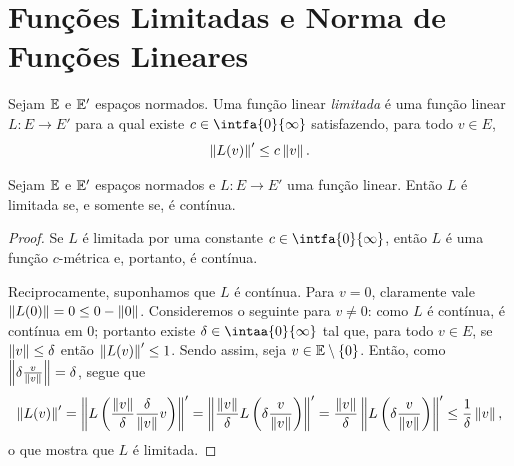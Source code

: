 \section{Funções Limitadas e Norma de Funções Lineares}

\begin{defi}
Sejam $\mathbb{E}$ e $\mathbb{E}'$ espaços normados. Uma função linear \emph{limitada} é uma função linear $L\colon E \to E'$ para a qual existe $c \in \intfa{0}{\infty}$ satisfazendo, para todo $v \in E$,
	\begin{equation*}
	\left\Vert{L(v)}\right\Vert' \leq c \left\Vert{v}\right\Vert.
	\end{equation*}
\end{defi}


\begin{prop}
Sejam $\mathbb{E}$ e $\mathbb{E}'$ espaços normados e $L\colon E \to E'$ uma função linear. Então $L$ é limitada se, e somente se, é contínua.
\end{prop}
\begin{proof}
Se $L$ é limitada por uma constante $c \in \intfa{0}{\infty}$, então $L$ é uma função $c$-métrica e, portanto, é contínua.

Reciprocamente, suponhamos que $L$ é contínua. Para $v=0$, claramente vale $\left\Vert{L(0)}\right\Vert = 0 \leq 0 - \left\Vert{0}\right\Vert$. Consideremos o seguinte para $v \neq 0$: como $L$ é contínua, é contínua em $0$; portanto existe $\delta \in \intaa{0}{\infty}$ tal que, para todo $v \in E$, se $\left\Vert{v}\right\Vert \leq \delta$ então $\left\Vert{L(v)}\right\Vert' \leq 1$. Sendo assim, seja $v \in \mathbb{E} \setminus \{0\}$. Então, como $\left\Vert{\delta\frac{v}{\left\Vert{v}\right\Vert}}\right\Vert=\delta$, segue que
	\begin{equation*}
	\left\Vert{L(v)}\right\Vert' = \left\Vert{L\left(\frac{\left\Vert{v}\right\Vert}{\delta}\frac{\delta}{\left\Vert{v}\right\Vert}v\right)}\right\Vert' = \left\Vert{\frac{\left\Vert{v}\right\Vert}{\delta}L\left(\delta\frac{v}{\left\Vert{v}\right\Vert}\right)}\right\Vert' = \frac{\left\Vert{v}\right\Vert}{\delta}\left\Vert{L\left(\delta\frac{v}{\left\Vert{v}\right\Vert}\right)}\right\Vert' \leq \frac{1}{\delta}\left\Vert{v}\right\Vert,
	\end{equation*}
o que mostra que $L$ é limitada.
\end{proof}

